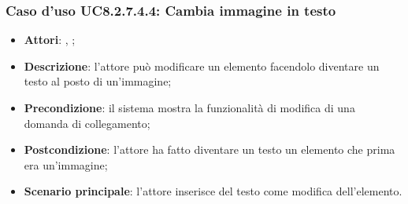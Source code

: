 		\subsubsection{Caso d'uso UC8.2.7.4.4: Cambia immagine in testo}
		\label{UC8.2.7.4.4}
		\begin{itemize}
			\item \textbf{Attori}: \uau, \uaupro;
			\item \textbf{Descrizione}: l'attore può modificare un elemento facendolo diventare un testo al posto di un'immagine;
			\item \textbf{Precondizione}: il sistema mostra la funzionalità di modifica di una domanda di collegamento; 
			\item \textbf{Postcondizione}: l'attore ha fatto diventare un testo un elemento che prima era un'immagine;
			\item \textbf{Scenario principale}: l'attore inserisce del testo come modifica dell'elemento.  
		\end{itemize}